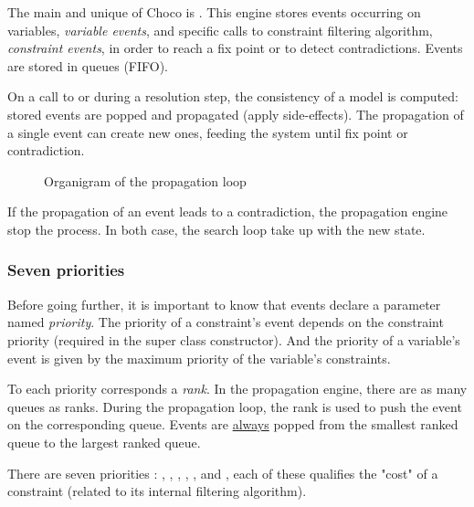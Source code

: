 
The main and unique  of Choco is . This engine stores events occurring on variables, \textit{variable events}, and specific calls to constraint filtering algorithm, \textit{constraint events}, in order to reach a \gls{fix point} or to detect contradictions. Events are stored in queues (FIFO).  

On a call to  or during a resolution step, the consistency of a model is computed: stored events are popped and propagated (apply side-effects). The propagation of a single event can create new ones, feeding the system until fix point or contradiction. 



\begin{figure}[!htp]
	\centerline{}
	\caption[]{Organigram of the propagation loop}\label{fig:media/propagationloop.pdf}
\end{figure}

 
If the propagation of an event leads to a contradiction, the propagation engine stop the process. In both case, the search loop take up with the new state.

\subsubsection{Seven priorities}

Before going further, it is important to know that events declare a parameter named \textit{priority}. The priority of a constraint's event depends on the constraint priority (required in the super class constructor). And the priority of a variable's event is given by the maximum priority of the variable's constraints. 

To each priority corresponds a \textit{rank}. In the propagation engine, there are as many queues as ranks. 
During the propagation loop, the rank is used to push the event on the corresponding queue. Events are \underline{always} popped from the smallest ranked queue to the largest ranked queue.

There are seven priorities :  , , , , ,  and , each of these qualifies the "cost" of a constraint (related to its internal filtering algorithm). 

